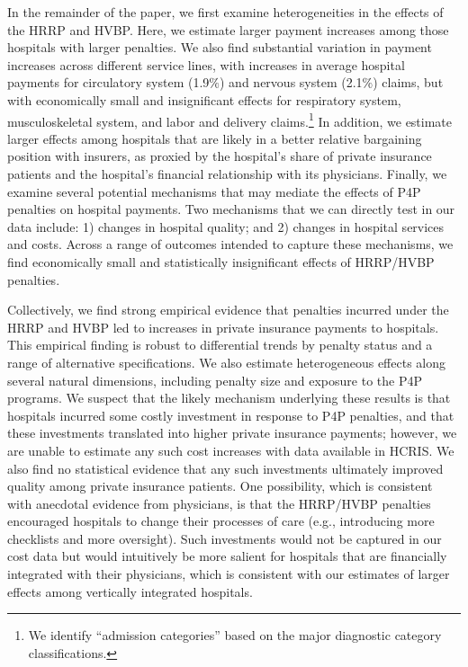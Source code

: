 \documentclass[12pt]{article}
\begin{document}
In the remainder of the paper, we first examine heterogeneities in the effects of the HRRP and HVBP. Here, we estimate larger payment increases among those hospitals with larger penalties. We also find substantial variation in payment increases across different service lines, with increases in average hospital payments for circulatory system (1.9$\%$) and nervous system (2.1$\%$) claims, but with economically small and insignificant effects for respiratory system, musculoskeletal system, and labor and delivery claims.\footnote{We identify ``admission categories'' based on the major diagnostic category classifications.} In addition, we estimate larger effects among hospitals that are likely in a better relative bargaining position with insurers, as proxied by the hospital's share of private insurance patients and the hospital's financial relationship with its physicians. Finally, we examine several potential mechanisms that may mediate the effects of P4P penalties on hospital payments. Two mechanisms that we can directly test in our data include: 1) changes in hospital quality; and 2) changes in hospital services and costs. Across a range of outcomes intended to capture these mechanisms, we find economically small and statistically insignificant effects of HRRP/HVBP penalties.

Collectively, we find strong empirical evidence that penalties incurred under the HRRP and HVBP led to increases in private insurance payments to hospitals. This empirical finding is robust to differential trends by penalty status and a range of alternative specifications. We also estimate heterogeneous effects along several natural dimensions, including penalty size and exposure to the P4P programs. We suspect that the likely mechanism underlying these results is that hospitals incurred some costly investment in response to P4P penalties, and that these investments translated into higher private insurance payments; however, we are unable to estimate any such cost increases with data available in HCRIS. We also find no statistical evidence that any such investments ultimately improved quality among private insurance patients. One possibility, which is consistent with anecdotal evidence from physicians, is that the HRRP/HVBP penalties encouraged hospitals to change their processes of care (e.g., introducing more checklists and more oversight). Such investments would not be captured in our cost data but would intuitively be more salient for hospitals that are financially integrated with their physicians, which is consistent with our estimates of larger effects among vertically integrated hospitals.
\end{document}
